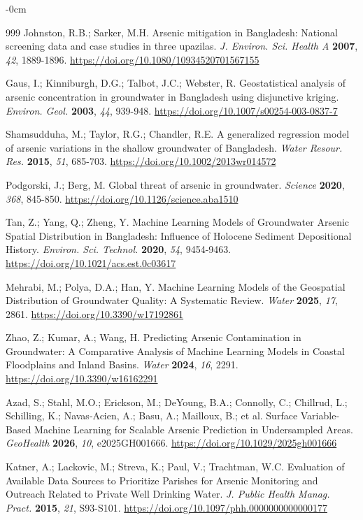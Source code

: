 \documentclass[sustainability,article,submit,pdftex,moreauthors]{Definitions/mdpi}
\begin{document}
\begin{adjustwidth}{-\extralength}{0cm}
\begin{thebibliography}{999}
Johnston, R.B.; Sarker, M.H. Arsenic mitigation in Bangladesh: National screening data and case studies in three upazilas. \textit{J. Environ. Sci. Health A} \textbf{2007}, \textit{42}, 1889-1896. \url{https://doi.org/10.1080/10934520701567155}

Gaus, I.; Kinniburgh, D.G.; Talbot, J.C.; Webster, R. Geostatistical analysis of arsenic concentration in groundwater in Bangladesh using disjunctive kriging. \textit{Environ. Geol.} \textbf{2003}, \textit{44}, 939-948. \url{https://doi.org/10.1007/s00254-003-0837-7}

Shamsudduha, M.; Taylor, R.G.; Chandler, R.E. A generalized regression model of arsenic variations in the shallow groundwater of Bangladesh. \textit{Water Resour. Res.} \textbf{2015}, \textit{51}, 685-703. \url{https://doi.org/10.1002/2013wr014572}

Podgorski, J.; Berg, M. Global threat of arsenic in groundwater. \textit{Science} \textbf{2020}, \textit{368}, 845-850. \url{https://doi.org/10.1126/science.aba1510}

Tan, Z.; Yang, Q.; Zheng, Y. Machine Learning Models of Groundwater Arsenic Spatial Distribution in Bangladesh: Influence of Holocene Sediment Depositional History. \textit{Environ. Sci. Technol.} \textbf{2020}, \textit{54}, 9454-9463. \url{https://doi.org/10.1021/acs.est.0c03617}

Mehrabi, M.; Polya, D.A.; Han, Y. Machine Learning Models of the Geospatial Distribution of Groundwater Quality: A Systematic Review. \textit{Water} \textbf{2025}, \textit{17}, 2861. \url{https://doi.org/10.3390/w17192861}

Zhao, Z.; Kumar, A.; Wang, H. Predicting Arsenic Contamination in Groundwater: A Comparative Analysis of Machine Learning Models in Coastal Floodplains and Inland Basins. \textit{Water} \textbf{2024}, \textit{16}, 2291. \url{https://doi.org/10.3390/w16162291}

Azad, S.; Stahl, M.O.; Erickson, M.; DeYoung, B.A.; Connolly, C.; Chillrud, L.; Schilling, K.; Navas‐Acien, A.; Basu, A.; Mailloux, B.; et al. Surface Variable‐Based Machine Learning for Scalable Arsenic Prediction in Undersampled Areas. \textit{GeoHealth} \textbf{2026}, \textit{10}, e2025GH001666. \url{https://doi.org/10.1029/2025gh001666}

Katner, A.; Lackovic, M.; Streva, K.; Paul, V.; Trachtman, W.C. Evaluation of Available Data Sources to Prioritize Parishes for Arsenic Monitoring and Outreach Related to Private Well Drinking Water. \textit{J. Public Health Manag. Pract.} \textbf{2015}, \textit{21}, S93-S101. \url{https://doi.org/10.1097/phh.0000000000000177}


\end{thebibliography}
\end{adjustwidth}
\end{document}
